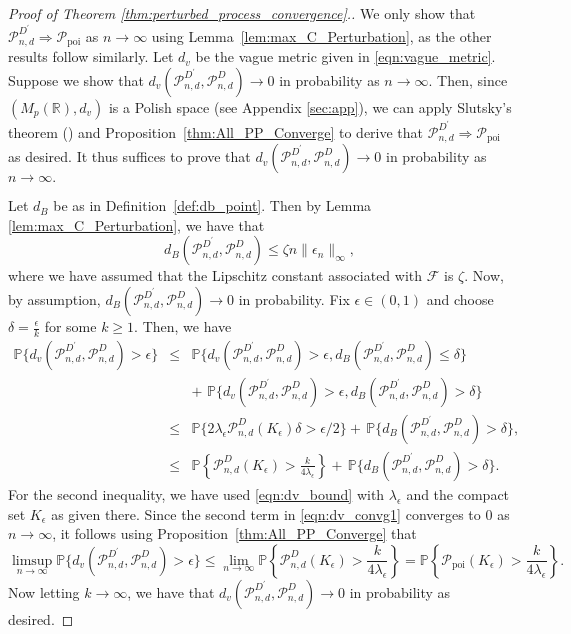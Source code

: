 \documentclass[12pt]{amsart}
\renewcommand{\Pr}{\mathbb{P}}
\newcommand{\PoiP}{\mathscr{P}_{\text{poi}}}
\newcommand{\PoiD}{\mathscr{P}_{n, d}^{D}}
\newcommand{\PoiDt}{\mathscr{P}_{n, d}^{D^\prime}}
\numberwithin{equation}{section}
\numberwithin{theorem}{section}
\newcommand{\Real}{\mathbb R}
\newcommand{\1}{\mathbf{1}}
\def\sF{\mathscr{F}}
\begin{document}
\begin{proof}[Proof of Theorem \ref{thm:perturbed_process_convergence}.]
We only show that $\PoiDt \Rightarrow \PoiP$ as $n \to \infty$ using Lemma~\ref{lem:max_C_Perturbation}, as the other results follow similarly. Let $d_v$ be the vague metric given in \eqref{eqn:vague_metric}. Suppose we show that $d_{v}(\PoiDt, \PoiD) \to 0$ in probability as $n \to \infty.$ Then, since $(M_p(\Real),d_{v})$ is a Polish space (see Appendix \ref{sec:app}), we can apply Slutsky's theorem (\cite[Chapter 3, Corollary 3.3]{ethier2009markov}) and Proposition~\ref{thm:All_PP_Converge} to derive that $\PoiDt \Rightarrow \PoiP$ as desired. It thus suffices to prove that $d_{v}(\PoiDt, \PoiD) \to 0$ in probability as $n \to \infty.$

Let $d_B$ be as in Definition~\ref{def:db_point}. Then by Lemma \ref{lem:max_C_Perturbation}, we have that
%
\[
d_B(\PoiDt, \PoiD) \leq \zeta n \|\epsilon_{n}\|_{\infty},
\]
%
where we have assumed that the Lipschitz constant  associated with $\sF$ is $\zeta.$ Now, by assumption, $d_B(\PoiDt, \PoiD) \to 0$ in probability. Fix $\epsilon \in (0,1)$ and choose $\delta = \frac{\epsilon}{k}$ for some $k \geq 1.$ Then, we have
%
\begin{eqnarray}
\Pr\{d_v(\PoiDt, \PoiD) > \epsilon\} & \leq & \Pr\{d_v(\PoiDt, \PoiD) > \epsilon, d_B(\PoiDt, \PoiD)  \leq \delta\} \nonumber \\
&  & + \, \, \Pr\{d_v(\PoiDt, \PoiD) > \epsilon, d_B(\PoiDt, \PoiD) > \delta\}  \nonumber \\
& \leq & \Pr\{2\lambda_\epsilon\PoiD(K_{\epsilon})\delta > \epsilon/2\} + \, \Pr\{d_B(\PoiDt, \PoiD) > \delta\},  \nonumber \\
& \leq &  \Pr\left\{\PoiD(K_{\epsilon}) > \frac{k}{4\lambda_\epsilon}\right\} + \, \Pr\{d_B(\PoiDt, \PoiD) > \delta\}. \label{eqn:dv_convg1}
\end{eqnarray}
%
For the second inequality, we have used \eqref{eqn:dv_bound} with $\lambda_\epsilon$ and the compact set $K_{\epsilon}$ as given there. Since the second term in \eqref{eqn:dv_convg1} converges to $0$ as $n \to \infty$, it follows using Proposition~\ref{thm:All_PP_Converge} that
%
\[
\limsup_{n \to \infty} \Pr\{d_v(\PoiDt, \PoiD) > \epsilon\} \leq \lim_{n \to \infty}\Pr\left\{\PoiD(K_{\epsilon}) > \frac{k}{4\lambda_\epsilon}\right\} = \Pr\left\{\PoiP(K_{\epsilon}) > \frac{k}{4\lambda_\epsilon}\right\}.
\]
%
Now letting $k \to \infty$, we have that $d_v(\PoiDt, \PoiD) \to 0$ in probability as desired.
\end{proof}
\end{document}
